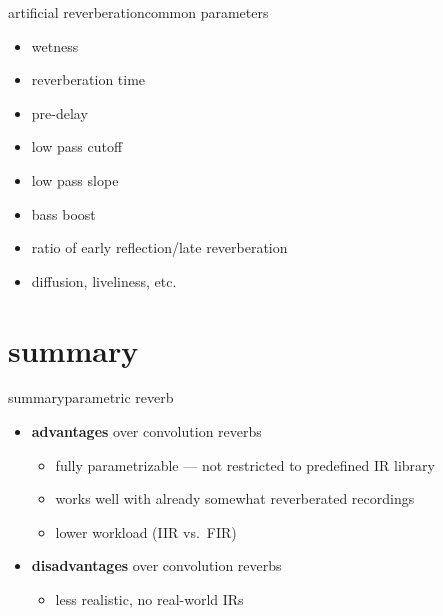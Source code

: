 \begin{frame}{artificial reverberation}{common parameters}
	\begin{itemize}
		\item	wetness
		\pause
		\item	reverberation time
		\pause
		\item	pre-delay
		\pause
		\item	low pass cutoff
		\pause
		\item	low pass slope
		\pause
		\item	bass boost
		\pause
		\item	ratio of early reflection/late reverberation
		\pause
		\item	diffusion, liveliness, etc.
	\end{itemize}
\end{frame}

	
\section{summary}
		\begin{frame}{summary}{parametric reverb}
            \begin{itemize}
                \item \textbf{advantages} over convolution reverbs
                    \begin{itemize}
                        \item   fully parametrizable --- not restricted to predefined IR library
                        \item   works well with already somewhat reverberated recordings 
                        \item   lower workload (IIR vs.\ FIR)
                    \end{itemize}
                \bigskip
                \item<2-> \textbf{disadvantages} over convolution reverbs
                    \begin{itemize}
                        \item   less realistic, no real-world IRs
                    \end{itemize}
            \end{itemize}
 		\end{frame}



